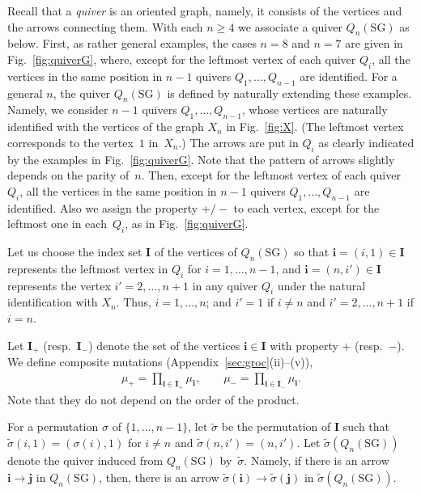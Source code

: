 Recall that a {\em quiver\/} is an oriented graph,
namely, it consists of the vertices and the arrows
connecting them.
With each $n \geq 4$ we associate
 a quiver $Q_{n}(\mathrm{SG})$ as below.
First, as rather general examples, the cases $n=8$ and $n=7$ are given in
 Fig.~\ref{fig:quiverG},
where, except for the leftmost vertex of each quiver $Q_i$,
 all the  vertices in the same position
 in  $n-1$ quivers $Q_1,\dots,Q_{n-1}$ are
identif\/ied.
For a general $n$,  the quiver $Q_{n}(\mathrm{SG})$ is def\/ined
by naturally extending these examples.
Namely, we consider $n-1$ quivers $Q_1,\dots, Q_{n-1}$,
whose vertices are naturally identif\/ied with
the vertices of the graph $X_n$ in Fig.~\ref{fig:X}.
(The leftmost vertex corresponds to the vertex~$1$ in~$X_n$.)
The arrows are put in $Q_i$ as clearly indicated by the examples
in Fig.~\ref{fig:quiverG}.
Note that the pattern of arrows slightly
depends on the parity of~$n$.
Then, except for the leftmost vertex of each quiver~$Q_i$,
 all the  vertices in the same position
 in  $n-1$ quivers $Q_1,\dots,Q_{n-1}$ are
identif\/ied.
Also we assign the property $+/-$
to  each vertex, except for the leftmost one in each~$Q_i$,
 as in Fig.~\ref{fig:quiverG}.

Let us choose  the index set $\mathbf{I}$
of the vertices of $Q_{n}(\mathrm{SG})$
so that $\mathbf{i}=(i,1)\in \mathbf{I}$ represents
the leftmost vertex in $Q_i$ for $i=1,\dots,n-1$,
 and $\mathbf{i}=(n,i')\in \mathbf{I}$ represents
the vertex $i'=2,\dots,n+1$ in any quiver $Q_i$
under the natural
identif\/ication with $X_n$.
Thus, $i=1,\dots,n$; and $i'=1$ if $i\neq n$
and $i'=2,\dots,n+1$ if $i=n$.

Let $\mathbf{I}_+$
(resp.\ $\mathbf{I}_-$)
denote the set of the vertices $\mathbf{i}\in \mathbf{I}$ with
property  $+$ (resp.\  $-$).
We def\/ine composite mutations (Appendix~\ref{sec:groc}(ii)--(v)),
\begin{gather*}
\mu_+=\prod_{\mathbf{i}\in\mathbf{I}_+}
\mu_{\mathbf{i}},
\qquad
\mu_-=\prod_{\mathbf{i}\in\mathbf{I}_-}
\mu_{\mathbf{i}}.
\end{gather*}
Note that they do not depend on the order of the product.

For a permutation $\sigma$ of $\{1,\dots,n-1 \}$,
let $\tilde{\sigma}$ be the permutation of
$\mathbf{I}$ such that
$\tilde{\sigma}(i,1)=(\sigma(i),1)$ for $i\neq n$
and $\tilde{\sigma}(n,i')=(n,i')$.
Let $\tilde{\sigma}(Q_{n}(\mathrm{SG}))$
denote the
quiver induced from $Q_{n}(\mathrm{SG})$
 by~$\tilde{\sigma}$.
Namely, if there is an arrow
 $\mathbf{i}\rightarrow
\mathbf{j}$ in $Q_{n}(\mathrm{SG})$,
then, there is an arrow
$\tilde{\sigma}(\mathbf{i})
\rightarrow
\tilde{\sigma}(\mathbf{j})
$
in  $\tilde{\sigma}(Q_{n}(\mathrm{SG}))$.

